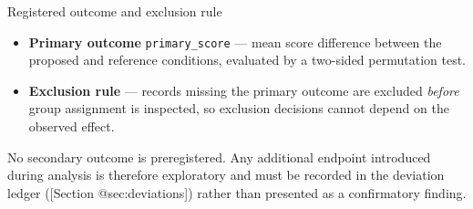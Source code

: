 \documentclass[
  ignorenonframetext,
]{beamer}
\providecommand{\tightlist}{%
  \setlength{\itemsep}{0pt}\setlength{\parskip}{0pt}}
\begin{document}
\begin{frame}{Registered outcome and exclusion
rule}
\protect{}\label{registered-outcome-and-exclusion-rule}
\begin{itemize}
\tightlist
\item
  \textbf{Primary outcome} \texttt{primary\_score} --- mean score
  difference between the proposed and reference conditions, evaluated by
  a two-sided permutation test.
\item
  \textbf{Exclusion rule} --- records missing the primary outcome are
  excluded \emph{before} group assignment is inspected, so exclusion
  decisions cannot depend on the observed effect.
\end{itemize}

No secondary outcome is preregistered. Any additional endpoint
introduced during analysis is therefore exploratory and must be recorded
in the deviation ledger ({[}Section @sec:deviations{]}) rather than
presented as a confirmatory finding.
\end{frame}
\end{document}
